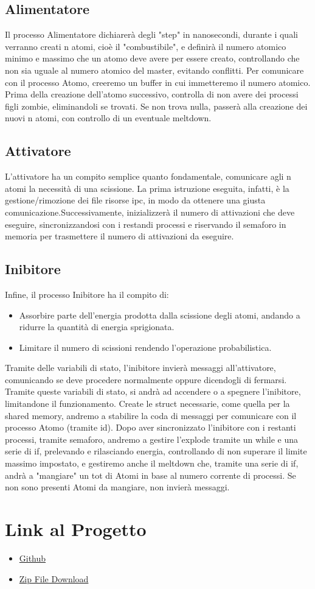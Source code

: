 \documentclass{article}
\begin{document}
\subsection{Alimentatore}
Il processo Alimentatore dichiarerà degli "step" in nanosecondi, durante i quali verranno creati n atomi, cioè il "combustibile", e definirà il numero atomico minimo e massimo che un atomo deve avere per essere creato, controllando che non sia uguale al numero atomico del master, evitando conflitti. Per comunicare con il processo Atomo, creeremo un buffer in cui immetteremo il numero atomico. Prima della creazione dell'atomo successivo, controlla di non avere dei processi figli zombie, eliminandoli se trovati. Se non trova nulla, passerà alla creazione dei nuovi n atomi, con controllo di un eventuale meltdown.

\subsection{Attivatore}
L'attivatore ha un compito semplice quanto fondamentale, comunicare agli n atomi la necessità di una scissione. La prima istruzione eseguita, infatti, è la gestione/rimozione dei file risorse ipc, in modo da ottenere una giusta comunicazione.Successivamente, inizializzerà il numero di attivazioni che deve eseguire, sincronizzandosi con i restandi processi e riservando il semaforo in memoria per trasmettere il numero di attivazioni da eseguire.


\subsection{Inibitore}
Infine, il processo Inibitore ha il compito di:
\begin{itemize}
\item Assorbire parte dell'energia prodotta dalla scissione degli atomi, andando a ridurre la quantità di energia sprigionata.
\item Limitare il numero di scissioni rendendo l'operazione probabilistica.
\end{itemize}
Tramite delle variabili di stato, l'inibitore invierà messaggi all'attivatore, comunicando se deve procedere normalmente oppure dicendogli di fermarsi. 
Tramite queste variabili di stato, si andrà ad accendere o a spegnere l'inibitore, limitandone il funzionamento.
Create le struct necessarie, come quella per la shared memory, andremo a stabilire la coda di messaggi per comunicare con il processo Atomo (tramite id).
Dopo aver sincronizzato l'inibitore con i restanti processi, tramite semaforo, andremo a gestire l'explode tramite un while e una serie di if, prelevando e rilasciando energia, controllando di non superare il limite massimo impostato, e gestiremo anche il meltdown che, tramite una serie di if, andrà a "mangiare" un tot di Atomi in base al numero corrente di processi. Se non sono presenti Atomi da mangiare, non invierà messaggi.

\section{Link al Progetto}
    \begin{itemize}
        \item \href{https://github.com/filippo-ferrando/progetto-so}{Github}
        \item \href{https://github.com/filippo-ferrando/progetto-so/archive/refs/heads/main.zip}{Zip File Download}
    \end{itemize}
\end{document}
